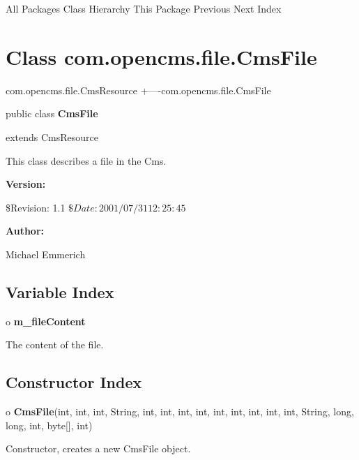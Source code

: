 \begin{PRE}
All Packages  Class Hierarchy  This Package  Previous  Next  Index
\end{PRE}

\htmlHR

\section{  Class com.opencms.file.CmsFile }

\begin{PRE}
com.opencms.file.CmsResource
   {\htmlBar}
   +----com.opencms.file.CmsFile
\end{PRE}

\htmlHR

\begin{description}
\item public class {\bf CmsFile}  
\item extends CmsResource 
\end{description}

This class describes a file in the Cms. 

\begin{description}
\item {\bf Version:}  

\$Revision: 1.1 $ \$Date: 2001/07/31 12:25:45 $  
\item {\bf Author:}  

Michael Emmerich 
\end{description}

\htmlHR

\subsection*{  Variable Index }

\begin{description}
\item o {\bf m\_fileContent}  

The content of the file. 
\end{description}

\subsection*{  Constructor Index }

\begin{description}
\item o {\bf CmsFile}(int, int, int, String, int, int, int, int, int, int,
int, int, int, String, long, long, int, byte[], int)  

Constructor, creates a new CmsFile object. 
\end{description}

